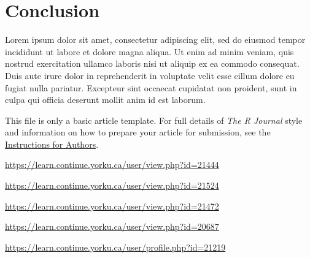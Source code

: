\hypertarget{conclusion}{%
\section{Conclusion}\label{conclusion}}

Lorem ipsum dolor sit amet, consectetur adipiscing elit, sed do eiusmod
tempor incididunt ut labore et dolore magna aliqua. Ut enim ad minim
veniam, quis nostrud exercitation ullamco laboris nisi ut aliquip ex ea
commodo consequat. Duis aute irure dolor in reprehenderit in voluptate
velit esse cillum dolore eu fugiat nulla pariatur. Excepteur sint
occaecat cupidatat non proident, sunt in culpa qui officia deserunt
mollit anim id est laborum.

This file is only a basic article template. For full details of
\emph{The R Journal} style and information on how to prepare your
article for submission, see the
\href{https://journal.r-project.org/share/author-guide.pdf}{Instructions
for Authors}.




\address{%
Viviane Adohouannon\\
York University School of Continious Studies\\
\\
}
\url{https://learn.continue.yorku.ca/user/view.php?id=21444}

\address{%
Kate Alexander\\
York University School of Continious Studies\\
\\
}
\url{https://learn.continue.yorku.ca/user/view.php?id=21524}

\address{%
Juan Arangote\\
York University School of Continious Studies\\
\\
}
\url{https://learn.continue.yorku.ca/user/view.php?id=21472}

\address{%
Dian Azbel\\
York University School of Continious Studies\\
\\
}
\url{https://learn.continue.yorku.ca/user/view.php?id=20687}

\address{%
Igor Baranov\\
York University School of Continious Studies\\
\\
}
\url{https://learn.continue.yorku.ca/user/profile.php?id=21219}

